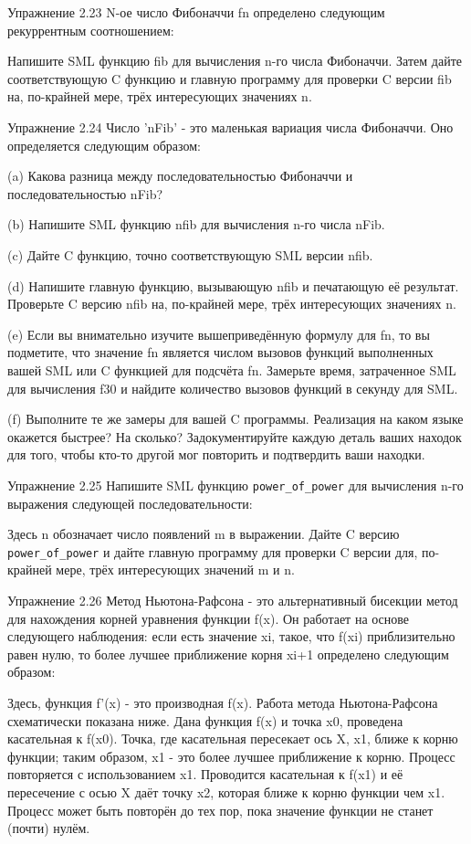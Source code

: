 Упражнение 2.23 N-ое число Фибоначчи fn определено следующим рекуррентным соотношением:

Напишите SML функцию fib для вычисления n-го числа Фибоначчи. Затем дайте соответствующую C функцию и главную программу для проверки C версии fib на, по-крайней мере, трёх интересующих значениях n.

Упражнение 2.24 Число 'nFib' - это маленькая вариация числа Фибоначчи. Оно определяется следующим образом:

(a) Какова разница между последовательностью Фибоначчи и последовательностью nFib?

(b) Напишите SML функцию nfib для вычисления n-го числа nFib.

(c) Дайте C функцию, точно соответствующую SML версии nfib.

(d) Напишите главную функцию, вызывающую nfib и печатающую её результат. Проверьте C версию nfib на, по-крайней мере, трёх интересующих значениях n.

(e) Если вы внимательно изучите вышеприведённую формулу для fn, то вы подметите, что значение fn является числом вызовов функций выполненных вашей SML или C функцией для подсчёта fn. Замерьте время, затраченное SML для вычисления f30 и найдите количество вызовов функций в секунду для SML.

(f) Выполните те же замеры для вашей C программы. Реализация на каком языке окажется быстрее? На сколько? Задокументируйте каждую деталь ваших находок для того, чтобы кто-то другой мог повторить и подтвердить ваши находки.

Упражнение 2.25 Напишите SML функцию \lstinline|power_of_power| для вычисления n-го выражения следующей последовательности:

Здесь n обозначает число появлений m в выражении. Дайте C версию \lstinline|power_of_power| и дайте главную программу для проверки C версии для, по-крайней мере, трёх интересующих значений m и n.

Упражнение 2.26 Метод Ньютона-Рафсона - это альтернативный бисекции метод для нахождения корней уравнения функции f(x). Он работает на основе следующего наблюдения: если есть значение xi, такое, что f(xi) приблизительно равен нулю, то более лучшее приближение корня xi+1 определено следующим образом:

Здесь, функция f'(x) - это производная f(x). Работа метода Ньютона-Рафсона схематически показана ниже. Дана функция f(x) и точка x0, проведена касательная к f(x0). Точка, где касательная пересекает ось X, x1, ближе к корню функции; таким образом, x1 - это более лучшее приближение к корню. Процесс повторяется с использованием x1. Проводится касательная к f(x1) и её пересечение с осью X даёт точку x2, которая ближе к корню функции чем x1. Процесс может быть повторён до тех пор, пока значение функции не станет (почти) нулём.

